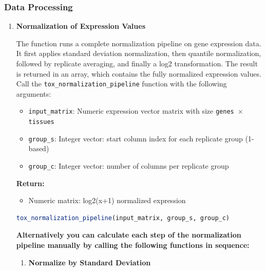 \subsubsection{Data Processing}
\begin{enumerate}
    \item \textbf{Normalization of Expression Values}
          
          The function runs a complete normalization pipeline on gene expression data.
          It first applies standard deviation normalization, then quantile normalization,
          followed by replicate averaging, and finally a log2 transformation. The
          result is returned in an array, which contains the fully normalized expression
          values. Call the \texttt{tox\_normalization\_pipeline} function with the following
          arguments:
          
          \begin{itemize}
            \item \texttt{input\_matrix}: Numeric expression vector matrix with size
                  \texttt{genes $\times$ tissues}
                  
            \item \texttt{group\_s}: Integer vector: start column index for each
                  replicate group (1-based)
                  
            \item \texttt{group\_c}: Integer vector: number of columns per replicate
                  group
          \end{itemize}
          
          \textbf{Return:}
          \begin{itemize}
            \item Numeric matrix: log2(x+1) normalized expression
          \end{itemize}
          
          \begin{lstlisting}[language=R, caption={R Normalization Pipeline}]
tox_normalization_pipeline(input_matrix, group_s, group_c)
          \end{lstlisting}
          
          \textbf{Alternatively you can calculate each step of the normalization
          pipeline manually by calling the following functions in sequence:}
          \begin{enumerate}
            \item \textbf{Normalize by Standard Deviation}
                  

\end{enumerate}
\end{enumerate}
